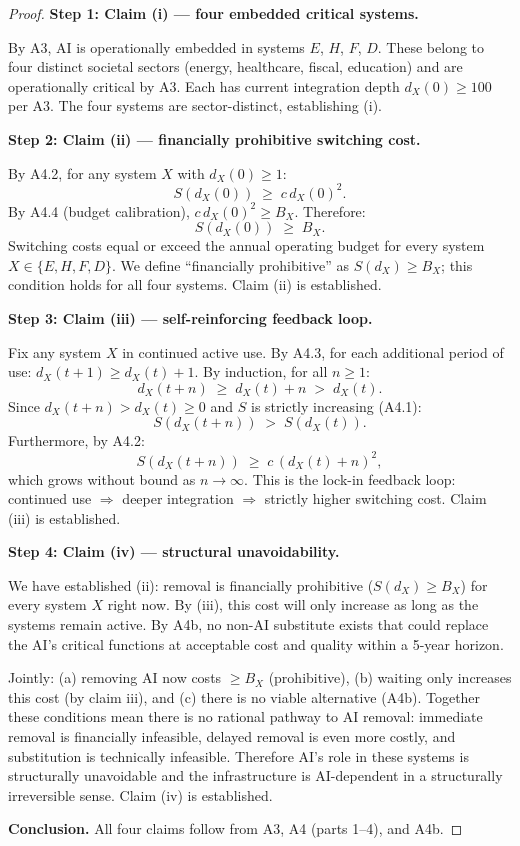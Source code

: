 \begin{proof}

\noindent\textbf{Step 1: Claim (i) — four embedded critical systems.}

By A3, AI is operationally embedded in systems $E$, $H$, $F$, $D$.
These belong to four distinct societal sectors (energy, healthcare, fiscal,
education) and are operationally critical by A3.  Each has current
integration depth $d_X(0) \geq 100$ per A3.  The four systems are sector-distinct,
establishing (i).

\medskip
\noindent\textbf{Step 2: Claim (ii) — financially prohibitive switching cost.}

By A4.2, for any system $X$ with $d_X(0) \geq 1$:
\[
  S(d_X(0)) \;\geq\; c\,d_X(0)^2.
\]
By A4.4 (budget calibration), $c\,d_X(0)^2 \geq B_X$.  Therefore:
\[
  S(d_X(0)) \;\geq\; B_X.
\]
Switching costs equal or exceed the annual operating budget for every
system $X \in \{E,H,F,D\}$.  We define ``financially prohibitive'' as
$S(d_X) \geq B_X$; this condition holds for all four systems.  Claim (ii)
is established.

\medskip
\noindent\textbf{Step 3: Claim (iii) — self-reinforcing feedback loop.}

Fix any system $X$ in continued active use.  By A4.3, for each additional
period of use: $d_X(t+1) \geq d_X(t) + 1$.  By induction, for all
$n \geq 1$:
\[
  d_X(t+n) \;\geq\; d_X(t) + n \;>\; d_X(t).
\]
Since $d_X(t+n) > d_X(t) \geq 0$ and $S$ is strictly increasing (A4.1):
\[
  S(d_X(t+n)) \;>\; S(d_X(t)).
\]
Furthermore, by A4.2:
\[
  S(d_X(t+n)) \;\geq\; c\,(d_X(t)+n)^2,
\]
which grows without bound as $n \to \infty$.  This is the lock-in
feedback loop: continued use $\Rightarrow$ deeper integration
$\Rightarrow$ strictly higher switching cost.  Claim (iii) is established.

\medskip
\noindent\textbf{Step 4: Claim (iv) — structural unavoidability.}

We have established (ii): removal is financially prohibitive ($S(d_X) \geq B_X$)
for every system $X$ right now.  By (iii), this cost will only increase
as long as the systems remain active.  By A4b, no non-AI substitute exists
that could replace the AI's critical functions at acceptable cost and
quality within a 5-year horizon.

Jointly: (a) removing AI now costs $\geq B_X$ (prohibitive), (b) waiting
only increases this cost (by claim iii), and (c) there is no viable
alternative (A4b).  Together these conditions mean there is no rational
pathway to AI removal: immediate removal is financially infeasible,
delayed removal is even more costly, and substitution is technically
infeasible.  Therefore AI's role in these systems is structurally
unavoidable and the infrastructure is AI-dependent in a structurally
irreversible sense.  Claim (iv) is established.

\medskip
\noindent\textbf{Conclusion.}
All four claims follow from A3, A4 (parts 1--4), and A4b.
\end{proof}

